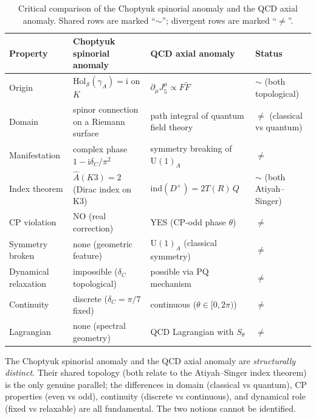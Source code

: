 \documentclass[11pt,a4paper]{article}
\newcommand{\dC}{\delta_C}
\providecommand{\ii}{}
\renewcommand{\ii}{\mathrm{i}}
\providecommand{\Hol}{}
\renewcommand{\Hol}{\mathrm{Hol}}
\theoremstyle{plain}
\theoremstyle{definition}
\theoremstyle{remark}
\begin{document}
\begin{table}[htbp]
\centering
\small
\caption{Critical comparison of the Choptyuk spinorial anomaly and the
QCD axial anomaly.  Shared rows are marked ``$\sim$''; divergent rows
are marked ``$\neq$''.}
\label{tab:anomaly-comparison}
\begin{tabularx}{\textwidth}{@{}lXXX@{}}
\toprule
Property & Choptyuk spinorial anomaly & QCD axial anomaly & Status \\
\midrule
Origin & $\Hol_{\mathcal{S}}(\gamma_A) = \ii$ on $K$
        & $\partial_\mu J_5^\mu \propto F\tilde F$
        & $\sim$ (both topological) \\
Domain & spinor connection on a Riemann surface
        & path integral of quantum field theory
        & $\neq$ (classical vs quantum) \\
Manifestation & complex phase $1-\ii\dC/\pi^2$
              & symmetry breaking of $\mathrm{U}(1)_A$
              & $\neq$ \\
Index theorem & $\hat A(K3) = 2$ (Dirac index on K3)
              & $\mathrm{ind}(D^+) = 2T(R)\,Q$
              & $\sim$ (both Atiyah--Singer) \\
CP violation & NO (real correction)
             & YES (CP-odd phase $\theta$)
             & $\neq$ \\
Symmetry broken & none (geometric feature)
                & $\mathrm{U}(1)_A$ (classical symmetry)
                & $\neq$ \\
Dynamical relaxation & impossible ($\dC$ topological)
                     & possible via PQ mechanism
                     & $\neq$ \\
Continuity & discrete ($\dC=\pi/7$ fixed)
           & continuous ($\theta\in[0,2\pi)$)
           & $\neq$ \\
Lagrangian & none (spectral geometry)
           & QCD Lagrangian with $S_\theta$
           & $\neq$ \\
\bottomrule
\end{tabularx}
\end{table}

\begin{verdict}
The Choptyuk spinorial anomaly and the QCD axial anomaly are
\emph{structurally distinct}.  Their shared topology (both relate to
the Atiyah--Singer index theorem) is the only genuine parallel; the
differences in domain (classical vs quantum), CP properties (even vs
odd), continuity (discrete vs continuous), and dynamical role (fixed
vs relaxable) are all fundamental.  The two notions cannot be
identified.
\end{verdict}
\end{document}
